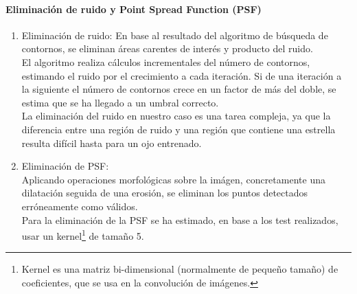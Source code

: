 	\paragraph{Eliminación de ruido y Point Spread Function (PSF)}
	\begin{enumerate}
	\item Eliminación de ruido:
	En base al resultado del algoritmo de búsqueda de contornos, se eliminan áreas carentes de interés y producto del ruido.
	\\El algoritmo realiza cálculos incrementales del número de contornos, estimando el ruido por el crecimiento a cada iteración. Si de una iteración a la siguiente el número de contornos crece en un factor de más del doble, se estima que se ha llegado a un umbral correcto.
	\\
	La eliminación del ruido en nuestro caso es una tarea compleja, ya que la diferencia entre una región de ruido y una región que contiene una estrella resulta difícil hasta para un ojo entrenado.
	\newline
	\item Eliminación de PSF:\\
    Aplicando operaciones morfológicas sobre la imágen, concretamente una dilatación seguida de una erosión, se eliminan los puntos detectados erróneamente como válidos.
    \\
    Para la eliminación de la PSF se ha estimado, en base a los test realizados, usar un kernel\footnote{Kernel es una matriz bi-dimensional (normalmente de pequeño tamaño) de coeficientes, que se usa en la convolución de imágenes. } de tamaño 5.
    	\begin{figure}[!htb]
    		\centering

\end{figure}
\end{enumerate}
